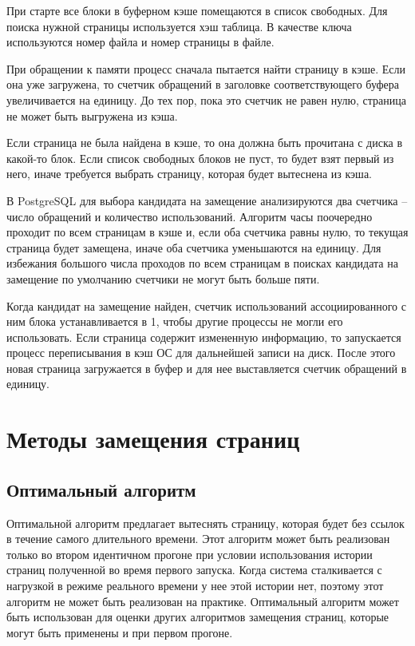 При старте все блоки в буферном кэше помещаются в список свободных.
Для поиска нужной страницы используется хэш таблица.
В качестве ключа используются номер файла и номер страницы в файле.

При обращении к памяти процесс сначала пытается найти страницу в кэше.
Если она уже загружена, то счетчик обращений в заголовке соответствующего буфера увеличивается на единицу.
До тех пор, пока это счетчик не равен нулю, страница не может быть выгружена из кэша.

Если страница не была найдена в кэше, то она должна быть прочитана с диска в какой-то блок.
Если список свободных блоков не пуст, то будет взят первый из него, иначе требуется выбрать страницу, которая будет вытеснена из кэша.

В PostgreSQL для выбора кандидата на замещение анализируются два счетчика -- число обращений и количество использований.
Алгоритм часы поочередно проходит по всем страницам в кэше и, если оба счетчика равны нулю, то текущая страница будет замещена, иначе оба счетчика уменьшаются на единицу.
Для избежания большого числа проходов по всем страницам в поисках кандидата на замещение по умолчанию счетчики не могут быть больше пяти.

Когда кандидат на замещение найден, счетчик использований ассоциированного с ним блока устанавливается в 1, чтобы другие процессы не могли его использовать.
Если страница содержит измененную информацию, то запускается процесс переписывания в кэш ОС для дальнейшей записи на диск.
После этого новая страница загружается в буфер и для нее выставляется счетчик обращений в единицу.

\section{Методы замещения страниц}
\subsection{Оптимальный алгоритм}

Оптимальной алгоритм предлагает вытеснять страницу, которая будет без ссылок в течение самого длительного времени.
Этот алгоритм может быть реализован только во втором идентичном прогоне при условии использования истории  страниц полученной во время первого запуска. 
Когда система сталкивается с нагрузкой в режиме реального времени у нее этой истории нет, поэтому этот алгоритм не может быть реализован на практике.
Оптимальный алгоритм может быть использован для оценки других алгоритмов замещения страниц, которые могут быть применены и при первом прогоне.

